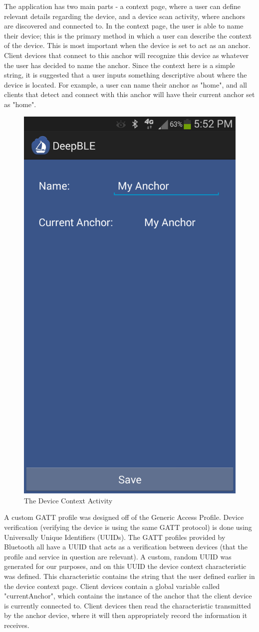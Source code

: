 \documentclass{sig-alternate}
\begin{document}
The application has two main parts - a context page, where
a user can define relevant details regarding the device, and
a device scan activity, where anchors are discovered and
connected to. In the context page, the user is able to 
name their device; this is the primary method in which a user
can describe the context of the device. This is most important
when the device is set to act as an anchor. Client devices
that connect to this anchor will recognize this device as 
whatever the user has decided to name the anchor. Since
the context here is a simple string, it is suggested that a 
user inputs something descriptive about where the device
is located. For example, a user can name their anchor
as "home", and all clients that detect and connect with this
anchor will have their current anchor set as "home".

\begin{figure}[h!]
	\begin{center}
		\includegraphics[width=.5\linewidth]{device_context}
	\end{center}
	\vspace{-12pt}
	\caption{The Device Context Activity}
	\label{fig:Device Context}
\end{figure}

A custom GATT profile was designed off of the Generic Access
Profile. Device verification (verifying the device is using the
same GATT protocol) is done using Universally Unique 
Identifiers (UUIDs). The GATT profiles provided by Bluetooth 
all have a UUID that acts as a verification between devices (that
the profile and service in question are relevant). A custom, 
random UUID was generated for our purposes, and on this 
UUID the device context characteristic was defined. This 
characteristic contains the string that the user defined earlier in 
the device context page. Client devices contain a global variable 
called "currentAnchor", which contains the instance of the anchor
that the client device is currently connected to. Client devices
then read the characteristic transmitted by the anchor device,
where it will then appropriately record the information it receives.
\end{document}
